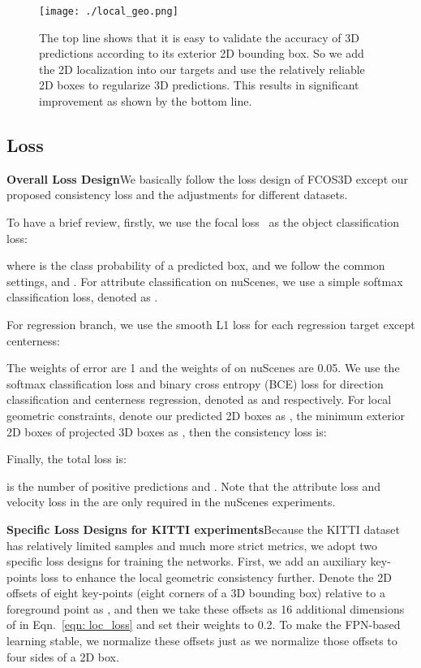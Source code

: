 \begin{figure*}
\begin{center}
\texttt{[image: ./local\_geo.png]}
\end{center}
   \vspace{-2ex}
   \caption{The top line shows that it is easy to validate the accuracy of 3D predictions according to its exterior 2D bounding box. So we add the 2D localization into our targets and use the relatively reliable 2D boxes to regularize 3D predictions. This results in significant improvement as shown by the bottom line.}
\label{fig: local_geo}
\vspace{-2ex}
\end{figure*}

\subsection{Loss}
\noindent\textbf{Overall Loss Design}\quad We basically follow the loss design of FCOS3D except our proposed consistency loss and the adjustments for different datasets.

To have a brief review, firstly, we use the focal loss~\cite{RetinaNet} as the object classification loss:

where  is the class probability of a predicted box, and we follow the common settings,  and . For attribute classification on nuScenes, we use a simple softmax classification loss, denoted as .

For regression branch, we use the smooth L1 loss for each regression target except centerness:

The weights of  error are 1 and the weights of  on nuScenes are 0.05. We use the softmax classification loss and binary cross entropy (BCE) loss for direction classification and centerness regression, denoted as  and  respectively. For local geometric constraints, denote our predicted 2D boxes as , the minimum exterior 2D boxes of projected 3D boxes as , then the consistency loss is:

Finally, the total loss is:

 is the number of positive predictions and . Note that the attribute loss  and velocity loss in the  are only required in the nuScenes experiments.

\noindent\textbf{Specific Loss Designs for KITTI experiments}\quad Because the KITTI dataset has relatively limited samples and much more strict metrics, we adopt two specific loss designs for training the networks. First, we add an auxiliary key-points loss to enhance the local geometric consistency further. Denote the 2D offsets of eight key-points (eight corners of a 3D bounding box) relative to a foreground point as , and then we take these offsets as 16 additional dimensions of  in Eqn.~\ref{eqn: loc_loss} and set their weights to 0.2. To make the FPN-based learning stable, we normalize these offsets just as we normalize those offsets to four sides of a 2D box.

